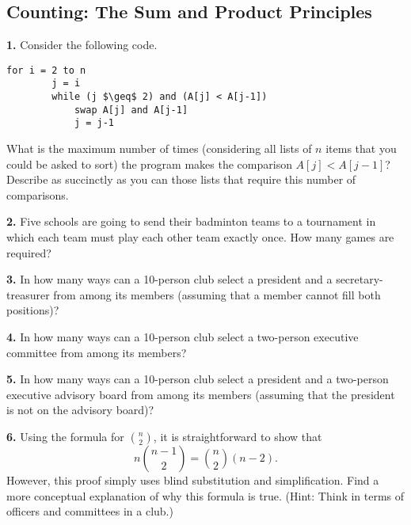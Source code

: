 \documentclass[12pt, letterpaper]{article}
\theoremstyle{definition}
\begin{document}
\subsection*{Counting: The Sum and Product Principles}

\vspace*{0.3in}\noindent
\textbf{1.} Consider the following code.
\begin{center}
    \begin{lstlisting}[label=p1, caption={Problem 1 Code}, mathescape=true]
    for i = 2 to n
        j = i
        while (j $\geq$ 2) and (A[j] < A[j-1])
            swap A[j] and A[j-1]
            j = j-1
    \end{lstlisting}
\end{center}
What is the maximum number of times (considering all lists of $n$ items that
you could be asked to sort) the program makes the comparison $A[j] < A[j - 1]$?
Describe as succinctly as you can those lists that require this number of
comparisons.

\vspace*{0.3in}\noindent
\textbf{2.} Five schools are going to send their badminton teams to a tournament
in which each team must play each other team exactly once. How many games are
required?

\vspace*{0.3in}\noindent
\textbf{3.} In how many ways can a 10-person club select a president and a
secretary-treasurer from among its members (assuming that a member cannot fill
both positions)?

\vspace*{0.3in}\noindent
\textbf{4.} In how many ways can a 10-person club select a two-person executive
committee from among its members?

\vspace*{0.3in}\noindent
\textbf{5.} In how many ways can a 10-person club select a president and a
two-person executive advisory board from among its members (assuming that the
president is not on the advisory board)?

\vspace*{0.3in}\noindent
\textbf{6.} Using the formula for $\binom{n}{2}$, it is straightforward to show
that
\begin{equation*}
    n\binom{n-1}{2} = \binom{n}{2}(n-2).
\end{equation*}
However, this proof simply uses blind substitution and simplification.
Find a more conceptual explanation of why this formula is true.
(Hint: Think in terms of officers and committees in a club.)
\end{document}
